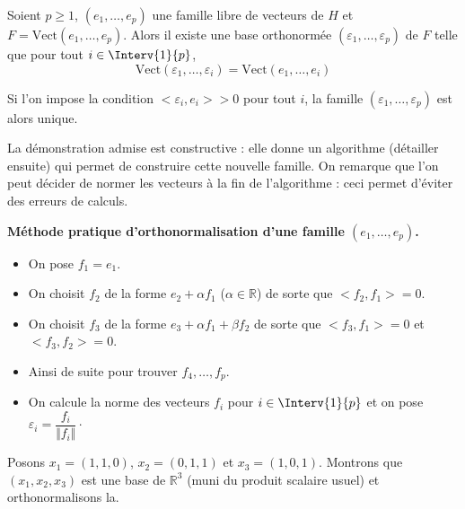 \documentclass[a4paper,10pt]{report}
\begin{document}
\begin{thm}
Soient $p \geq 1$, $(e_1, \ldots, e_p)$ une famille libre de vecteurs de $H$ et $F = \textrm{Vect}(e_1, \ldots, e_p)$. Alors il existe une base orthonormée $(\varepsilon_1, \ldots, \varepsilon_p)$ de $F$ telle que pour tout $i \in \Interv{1}{p}$,
$$ \textrm{Vect}(\varepsilon_1, \ldots, \varepsilon_i) = \textrm{Vect}(e_1, \ldots, e_i) $$
\end{thm}
%

\begin{rems}
\item Si l'on impose la condition $<\varepsilon_i, e_i>  >0$ pour tout $i$, la famille $(\varepsilon_1, \ldots, \varepsilon_p)$ est alors unique.
\item La démonstration admise est constructive : elle donne un algorithme (détailler ensuite) qui permet de construire cette nouvelle famille. On remarque que l'on peut décider de normer les vecteurs à la fin de l'algorithme : ceci permet d'éviter des erreurs de calculs.
\end{rems}

\medskip

\begin{center}
\textbf{Méthode pratique d'orthonormalisation d'une famille $(e_1, \ldots, e_p)$.}
\end{center}

\begin{itemize}
\item On pose $f_1=e_1$.
\item On choisit $f_2$ de la forme $e_2+ \alpha f_1$ ($\alpha \in \mathbb{R}$) de sorte que $<f_2, f_1>=0$.
\item On choisit $f_3$ de la forme $e_3 + \alpha f_1 + \beta f_2$ de sorte que $<f_3,f_1>=0$ et $<f_3,f_2>=0$.
\item Ainsi de suite pour trouver $f_4, \ldots, f_p$.
\item On calcule la norme des vecteurs $f_i$ pour $i \in \Interv{1}{p}$ et on pose $\varepsilon_i = \dfrac{f_i}{\Vert f_i \Vert} \cdot$
\end{itemize}

\medskip

\begin{ex} Posons $x_1= (1,1,0)$, $x_2=(0,1,1)$ et $x_3=(1,0,1)$. Montrons que $(x_1,x_2,x_3)$ est une base de $\mathbb{R}^3$ (muni du produit scalaire usuel) et orthonormalisons la.

\vspace{8.5cm}
\end{ex}
\end{document}
